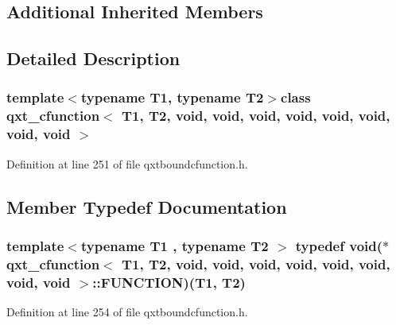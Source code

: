 \subsection*{Additional Inherited Members}


\subsection{Detailed Description}
\subsubsection*{template$<$typename T1, typename T2$>$class qxt\-\_\-cfunction$<$ T1, T2, void, void, void, void, void, void, void, void $>$}



Definition at line 251 of file qxtboundcfunction.\-h.



\subsection{Member Typedef Documentation}
\hypertarget{classqxt__cfunction_3_01_t1_00_01_t2_00_01void_00_01void_00_01void_00_01void_00_01void_00_01void_00_01void_00_01void_01_4_a7263a37914a8351bd6279e18f13558c2}{
\subsubsection[{F\-U\-N\-C\-T\-I\-O\-N}]{\setlength{\rightskip}{0pt plus 5cm}template$<$typename T1 , typename T2 $>$ typedef {\bf void}($\ast$ {\bf qxt\-\_\-cfunction}$<$ T1, T2, {\bf void}, {\bf void}, {\bf void}, {\bf void}, {\bf void}, {\bf void}, {\bf void}, {\bf void} $>$\-::F\-U\-N\-C\-T\-I\-O\-N)(T1, T2)}}\label{classqxt__cfunction_3_01_t1_00_01_t2_00_01void_00_01void_00_01void_00_01void_00_01void_00_01void_00_01void_00_01void_01_4_a7263a37914a8351bd6279e18f13558c2}


Definition at line 254 of file qxtboundcfunction.\-h.




